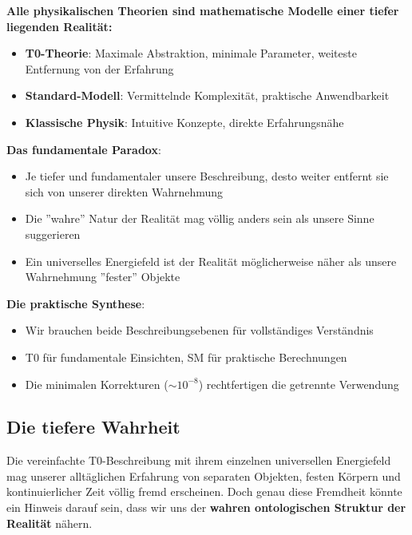 \documentclass[12pt,a4paper]{article}
\begin{document}
	\begin{tcolorbox}[colback=purple!5!white,colframe=purple!75!black,title=Kernaussage]
		\textbf{Alle physikalischen Theorien sind mathematische Modelle einer tiefer liegenden Realität:}
		
		\begin{itemize}
			\item \textbf{T0-Theorie}: Maximale Abstraktion, minimale Parameter, weiteste Entfernung von der Erfahrung
			\item \textbf{Standard-Modell}: Vermittelnde Komplexität, praktische Anwendbarkeit
			\item \textbf{Klassische Physik}: Intuitive Konzepte, direkte Erfahrungsnähe
		\end{itemize}
		
		\textbf{Das fundamentale Paradox}:
		\begin{itemize}
			\item Je tiefer und fundamentaler unsere Beschreibung, desto weiter entfernt sie sich von unserer direkten Wahrnehmung
			\item Die ''wahre'' Natur der Realität mag völlig anders sein als unsere Sinne suggerieren
			\item Ein universelles Energiefeld ist der Realität möglicherweise näher als unsere Wahrnehmung ''fester'' Objekte
		\end{itemize}
		
		\textbf{Die praktische Synthese}:
		\begin{itemize}
			\item Wir brauchen beide Beschreibungsebenen für vollständiges Verständnis
			\item T0 für fundamentale Einsichten, SM für praktische Berechnungen
			\item Die minimalen Korrekturen ($\sim 10^{-8}$) rechtfertigen die getrennte Verwendung
		\end{itemize}
	\end{tcolorbox}
	
	\subsection{Die tiefere Wahrheit}
	
	Die vereinfachte T0-Beschreibung mit ihrem einzelnen universellen Energiefeld mag unserer alltäglichen Erfahrung von separaten Objekten, festen Körpern und kontinuierlicher Zeit völlig fremd erscheinen. Doch genau diese Fremdheit könnte ein Hinweis darauf sein, dass wir uns der \textbf{wahren ontologischen Struktur der Realität} nähern.
	
\end{document}
